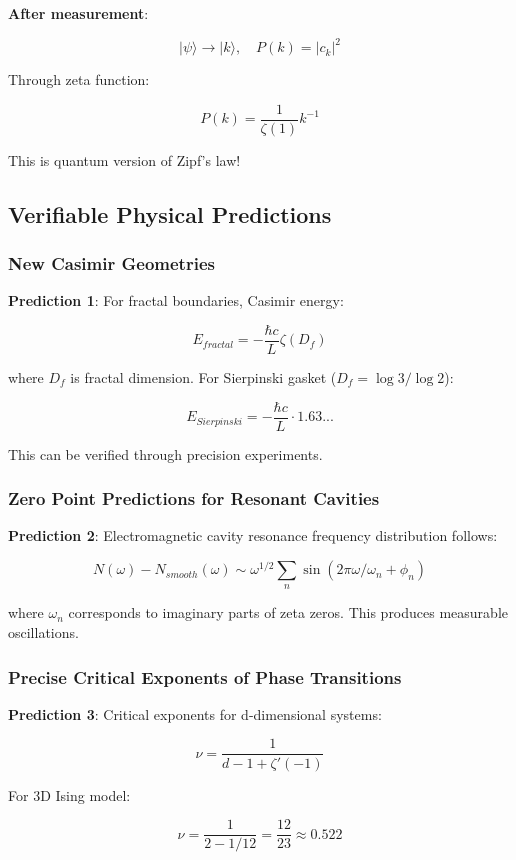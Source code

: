 \documentclass[12pt,a4paper]{article}
\begin{document}
\textbf{After measurement}:

$$|\psi\rangle \to |k\rangle, \quad P(k) = |c_k|^2$$

Through zeta function:

$$P(k) = \frac{1}{\zeta(1)} k^{-1}$$

This is quantum version of Zipf's law!

\subsection{Verifiable Physical Predictions}

\subsubsection{New Casimir Geometries}

\textbf{Prediction 1}: For fractal boundaries, Casimir energy:

$$E_{fractal} = -\frac{\hbar c}{L} \zeta(D_f)$$

where $D_f$ is fractal dimension. For Sierpinski gasket ($D_f = \log 3/\log 2$):

$$E_{Sierpinski} = -\frac{\hbar c}{L} \cdot 1.63...$$

This can be verified through precision experiments.

\subsubsection{Zero Point Predictions for Resonant Cavities}

\textbf{Prediction 2}: Electromagnetic cavity resonance frequency distribution follows:

$$N(\omega) - N_{smooth}(\omega) \sim \omega^{1/2} \sum_{n} \sin(2\pi\omega/\omega_n + \phi_n)$$

where $\omega_n$ corresponds to imaginary parts of zeta zeros. This produces measurable oscillations.

\subsubsection{Precise Critical Exponents of Phase Transitions}

\textbf{Prediction 3}: Critical exponents for d-dimensional systems:

$$\nu = \frac{1}{d-1+\zeta'(-1)}$$

For 3D Ising model:

$$\nu = \frac{1}{2-1/12} = \frac{12}{23} \approx 0.522$$
\end{document}
